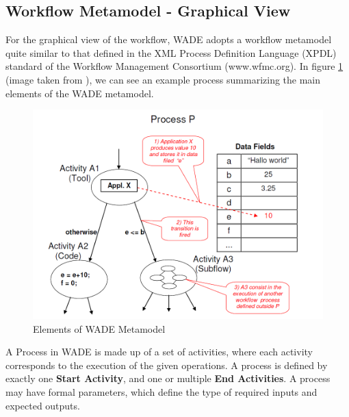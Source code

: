 \subsection{Workflow Metamodel - Graphical View}
For the graphical view of the workflow, WADE adopts a workflow metamodel quite similar to that defined in the XML Process Definition Language (XPDL) standard of the Workflow Management Consortium (www.wfmc.org). In figure \ref{fig:wade_elements} (image taken from \cite{GCDGMB08}), we can see an example process summarizing the main elements of the WADE metamodel.
\begin{figure}[h]
	\centering
		\includegraphics[width=1.00\textwidth]{images/wade_elements.png}
	\caption{Elements of WADE Metamodel \cite{GCDGMB08}}
	\label{fig:wade_elements}
\end{figure}

A Process in WADE is made up of a set of activities, where each activity corresponds to the execution of the given operations. A process is defined by exactly one \textbf{Start Activity}, and one or multiple \textbf{End Activities}. A process may have formal parameters, which define the type of required inputs and expected outputs.

